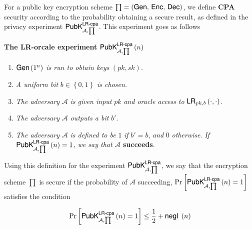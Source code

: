 \documentclass[../CryptoHW3.tex]{subfiles}
\begin{document}
\begin{flushleft}



  For a public key encryption scheme $\prod = \left( \text{{\fontfamily{phv}\selectfont Gen}}, \, \text{{\fontfamily{phv}\selectfont Enc}}, \, \text{{\fontfamily{phv}\selectfont Dec}} \right)$, we define \textbf{CPA} security according to the probability obtaining a secure result, as defined in the privacy experiment $\text{{\fontfamily{phv}\selectfont PubK}}^{\text{{\fontfamily{phv}\selectfont LR-cpa}}}_{\mathcal{A}, \prod}$.  This experiment goes as follows \newline


\textbf{The LR-orcale experiment} $\text{{\fontfamily{phv}\selectfont PubK}}^{\text{{\fontfamily{phv}\selectfont LR-cpa}}}_{\mathcal{A}, \prod} \left( n \right)$

\begin{enumerate}
  \item $\text{{\fontfamily{phv}\selectfont Gen}} \left( 1^n \right)$ \emph{is run to obtain keys} $\left( pk, sk \right)$.
  \item \emph{A uniform bit} $b \in \left\{ 0, 1 \right\}$ \emph{is chosen}.
  \item \emph{The adversary} $\mathcal{A}$ \emph{is given input} $pk$ \emph{and oracle access to} $\text{{\fontfamily{phv}\selectfont LR}}_{pk,b} \left( \cdot , \cdot \right)$.
  \item \emph{The adversary} $\mathcal{A}$ \emph{outputs a bit} $b'$.
  \item \emph{The adversary} $\mathcal{A}$ \emph{is defined to be} $1$ \emph{if} $b' = b$, \emph{and} $0$ \emph{otherwise}.  \emph{If} $\text{{\fontfamily{phv}\selectfont PubK}}^{\text{{\fontfamily{phv}\selectfont LR-cpa}}}_{\mathcal{A}, \prod} \left( n \right) = 1$, \emph{we say that} $\mathcal{A}$ \textbf{succeeds}.
\end{enumerate}

Using this definition for the experiment $\text{{\fontfamily{phv}\selectfont PubK}}^{\text{{\fontfamily{phv}\selectfont LR-cpa}}}_{\mathcal{A}, \prod}$, we say that the encryption scheme $\prod$ is secure if the probability of $\mathcal{A}$ succeeding, $\Pr \left[ \text{{\fontfamily{phv}\selectfont PubK}}^{\text{{\fontfamily{phv}\selectfont LR-cpa}}}_{\mathcal{A}, \prod} \left( n \right) = 1 \right]$ satisfies the condition 

\begin{align}
  \Pr \left[ \text{{\fontfamily{phv}\selectfont PubK}}^{\text{{\fontfamily{phv}\selectfont LR-cpa}}}_{\mathcal{A}, \prod} \left( n \right) = 1 \right] \leq \frac{1}{2} + \text{{\fontfamily{phv}\selectfont negl }} \left( n \right) \label{eq8a}
\end{align}


\end{flushleft}
\end{document}
